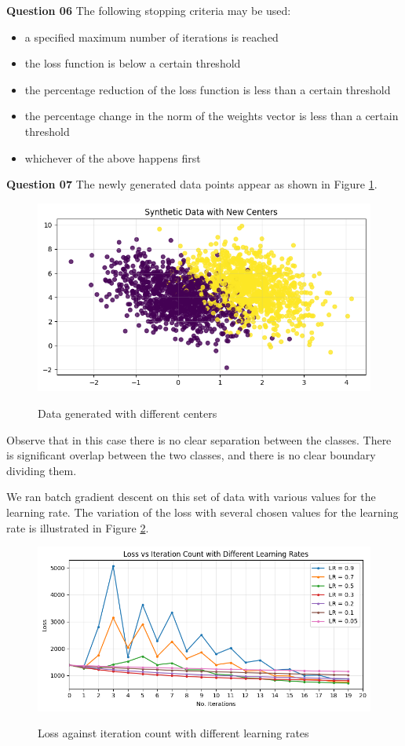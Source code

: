 \documentclass{article}[a4paper]
\begin{document}
	\textbf{Question 06} The following stopping criteria may be used:
	\begin{itemize}[noitemsep]
		\item a specified maximum number of iterations is reached
		\item the loss function is below a certain threshold
		\item the percentage reduction of the loss function is less than a certain threshold
		\item the percentage change in the norm of the weights vector is less than a certain threshold
		\item whichever of the above happens first
	\end{itemize}
	\medskip

	\textbf{Question 07} The newly generated data points appear as shown in Figure \ref{q3_7_1}.

	\begin{figure}[H]
		\centering
		\includegraphics[width=0.8\linewidth]{images/q3_7_1.png}
		\label{q3_7_1}
		\caption{Data generated with different centers}
	\end{figure}

	Observe that in this case there is no clear separation between the classes. There is significant overlap between the two classes, and there is no clear boundary dividing them.

	We ran batch gradient descent on this set of data with various values for the learning rate. The variation of the loss with several chosen values for the learning rate is illustrated in Figure \ref{q3_7_2}.

	\begin{figure}[H]
		\centering
		\includegraphics[width=0.8\linewidth]{images/q3_7_2.png}
		\label{q3_7_2}
		\caption{Loss against iteration count with different learning rates}
	\end{figure}
\end{document}
